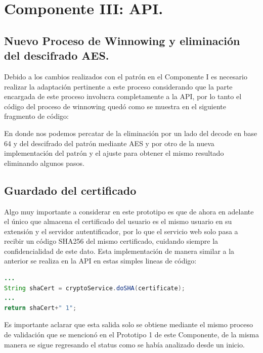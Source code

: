 \documentclass[12pt, a4paper, titlepage]{report}
\begin{document}
        
	
	    \section{Componente III: API.}
	    
	        \subsection{Nuevo Proceso de Winnowing y eliminación del descifrado AES.}

            	Debido  a  los  cambios  realizados  con  el  patrón  en  el  Componente  I  es necesario realizar la adaptación pertinente a este proceso considerando que la parte encargada de este proceso involucra completamente a la API, por lo tanto el código del proceso de winnowing quedó como se muestra en el siguiente fragmento de código: 
                
            
            	En donde nos podemos percatar de la eliminación por un lado del decode en base 64 y del descifrado del patrón mediante AES y por otro de la nueva implementación del patrón y el ajuste para obtener el mismo resultado eliminando algunos pasos. 

            \subsection{Guardado del certificado}

	            Algo muy importante a considerar en este prototipo es que de ahora en adelante el único que almacena el certificado del usuario es el mismo usuario en su extensión y el servidor autentificador, por lo que el servicio web solo pasa a recibir un código SHA256 del mismo certificado, cuidando siempre la confidencialidad de este dato. Esta implementación de manera similar a la anterior se realiza en la API en estas simples lineas de código:
	           
	            \begin{lstlisting}[language=Java,caption= Salida de la función makeWinnowing del Prototipo 2,label={cod:makeWinnowingReturn_P2}]
...
String shaCert = cryptoService.doSHA(certificate);	
...
return shaCert+" 1";
                \end{lstlisting}
                Es importante aclarar que esta salida solo se obtiene mediante el mismo proceso de validación que se mencionó en el Prototipo 1 de este Componente, de la misma manera se sigue regresando el status como se había analizado desde un inicio.
\end{document}
